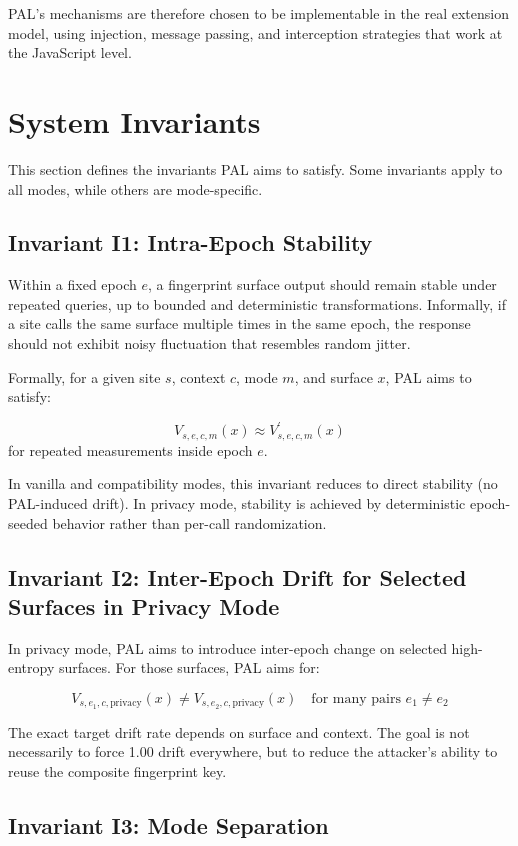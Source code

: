 \documentclass[11pt]{report}
\begin{document}
PAL’s mechanisms are therefore chosen to be implementable in the real extension model, using injection, message passing, and interception strategies that work at the JavaScript level.

\section{System Invariants}

This section defines the invariants PAL aims to satisfy. Some invariants apply to all modes, while others are mode-specific.

\subsection{Invariant I1: Intra-Epoch Stability}

Within a fixed epoch $e$, a fingerprint surface output should remain stable under repeated queries, up to bounded and deterministic transformations. Informally, if a site calls the same surface multiple times in the same epoch, the response should not exhibit noisy fluctuation that resembles random jitter.

Formally, for a given site $s$, context $c$, mode $m$, and surface $x$, PAL aims to satisfy:

\[
V_{s,e,c,m}(x) \approx V_{s,e,c,m}^{\prime}(x)
\]
for repeated measurements inside epoch $e$.

In vanilla and compatibility modes, this invariant reduces to direct stability (no PAL-induced drift). In privacy mode, stability is achieved by deterministic epoch-seeded behavior rather than per-call randomization.

\subsection{Invariant I2: Inter-Epoch Drift for Selected Surfaces in Privacy Mode}

In privacy mode, PAL aims to introduce inter-epoch change on selected high-entropy surfaces. For those surfaces, PAL aims for:

\[
V_{s,e_1,c,\text{privacy}}(x) \ne V_{s,e_2,c,\text{privacy}}(x)
\quad \text{for many pairs } e_1 \ne e_2
\]

The exact target drift rate depends on surface and context. The goal is not necessarily to force 1.00 drift everywhere, but to reduce the attacker’s ability to reuse the composite fingerprint key.

\subsection{Invariant I3: Mode Separation}
\end{document}
